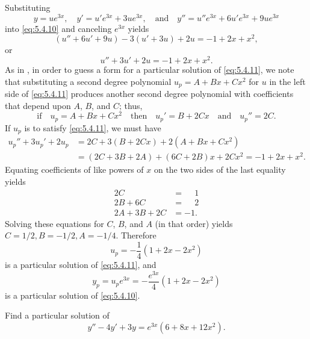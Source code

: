 \begin{solution}
Substituting
\[
y=ue^{3x},\quad y'=u'e^{3x}+3ue^{3x},\quad\text{and}\quad
y''=u''e^{3x}+6u'e^{3x}+9ue^{3x}
\]
into \eqref{eq:5.4.10} and  canceling $e^{3x}$  yields
\[
(u''+6u'+9u)-3(u'+3u)+2u=-1+2x+x^2,
\]
or
\begin{equation} \label{eq:5.4.11}
u''+3u'+2u=-1+2x+x^2.
\end{equation}
As in , in order to guess a form for a particular
solution of
\eqref{eq:5.4.11}, we note that substituting a second degree polynomial
$u_p=A+Bx+Cx^2$ for $u$ in the left side of \eqref{eq:5.4.11} produces
another second degree polynomial with coefficients that depend upon
$A$, $B$, and $C$;   thus,
\[
\text{if}\quad u_p=A+Bx+Cx^2\quad\text{then}\quad
u_p'=B+2Cx\quad\text{and}\quad  u_p''=2C.
\]
If $u_p$ is to satisfy \eqref{eq:5.4.11},  we must have
\begin{align*}
u_p''+3u_p'+2u_p
&=2C+3(B+2Cx)+2(A+Bx+Cx^2)\\
&=(2C+3B+2A)+(6C+2B)x+2Cx^2=-1+2x+x^2.
\end{align*}
Equating  coefficients of like powers of $x$ on the two sides of the
last equality yields
\begin{align*}
2C&=\phantom{-}1\\
2B+6C&=\phantom{-}2\\
2A+3B+2C&= -1.
\end{align*}
Solving these equations for $C$, $B$, and $A$ (in that order) yields
 $C=1/2,B=-1/2,A=-1/4$.  Therefore
\[
u_p=-\frac{1}{4}(1+2x-2x^2)
\]
is a particular solution of  \eqref{eq:5.4.11}, and
\[
y_p=u_pe^{3x}=-\frac{e^{3x}}{4}(1+2x-2x^2)
\]
is a particular solution of  \eqref{eq:5.4.10}.
\end{solution}

\begin{example}\label{example:5.4.5}
 Find a particular solution of
\begin{equation} \label{eq:5.4.12}
y''-4y'+3y=e^{3x}(6+8x+12x^2).
\end{equation}
\end{example}

